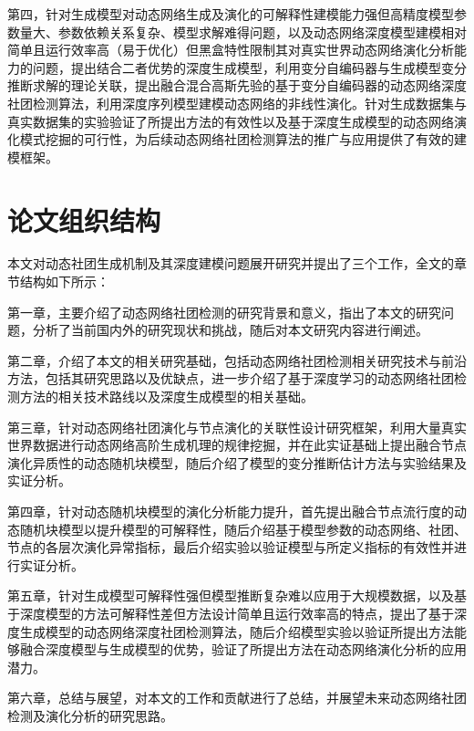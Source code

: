 第四，针对生成模型对动态网络生成及演化的可解释性建模能力强但高精度模型参数量大、参数依赖关系复杂、模型求解难得问题，以及动态网络深度模型建模相对简单且运行效率高（易于优化）但黑盒特性限制其对真实世界动态网络演化分析能力的问题，提出结合二者优势的深度生成模型，利用变分自编码器与生成模型变分推断求解的理论关联，提出融合混合高斯先验的基于变分自编码器的动态网络深度社团检测算法，利用深度序列模型建模动态网络的非线性演化。针对生成数据集与真实数据集的实验验证了所提出方法的有效性以及基于深度生成模型的动态网络演化模式挖掘的可行性，为后续动态网络社团检测算法的推广与应用提供了有效的建模框架。

\section{论文组织结构}
本文对动态社团生成机制及其深度建模问题展开研究并提出了三个工作，全文的章节结构如下所示：



第一章，主要介绍了动态网络社团检测的研究背景和意义，指出了本文的研究问题，分析了当前国内外的研究现状和挑战，随后对本文研究内容进行阐述。

第二章，介绍了本文的相关研究基础，包括动态网络社团检测相关研究技术与前沿方法，包括其研究思路以及优缺点，进一步介绍了基于深度学习的动态网络社团检测方法的相关技术路线以及深度生成模型的相关基础。

第三章，针对动态网络社团演化与节点演化的关联性设计研究框架，利用大量真实世界数据进行动态网络高阶生成机理的规律挖掘，并在此实证基础上提出融合节点演化异质性的动态随机块模型，随后介绍了模型的变分推断估计方法与实验结果及实证分析。

第四章，针对动态随机块模型的演化分析能力提升，首先提出融合节点流行度的动态随机块模型以提升模型的可解释性，随后介绍基于模型参数的动态网络、社团、节点的各层次演化异常指标，最后介绍实验以验证模型与所定义指标的有效性并进行实证分析。

第五章，针对生成模型可解释性强但模型推断复杂难以应用于大规模数据，以及基于深度模型的方法可解释性差但方法设计简单且运行效率高的特点，提出了基于深度生成模型的动态网络深度社团检测算法，随后介绍模型实验以验证所提出方法能够融合深度模型与生成模型的优势，验证了所提出方法在动态网络演化分析的应用潜力。

第六章，总结与展望，对本文的工作和贡献进行了总结，并展望未来动态网络社团检测及演化分析的研究思路。



